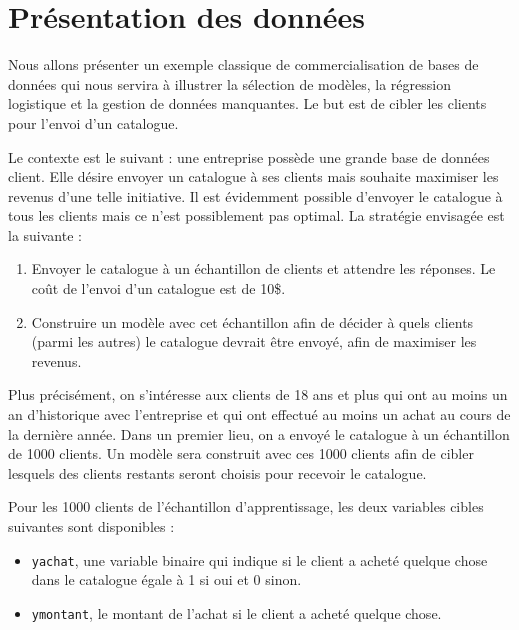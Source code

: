 \documentclass[
  11pt,
  letterpaper,
]{scrbook}
\providecommand{\tightlist}{%
  \setlength{\itemsep}{0pt}\setlength{\parskip}{0pt}}\usepackage{longtable,booktabs,array}
\theoremstyle{definition}
\theoremstyle{remark}
\begin{document}
\hypertarget{pruxe9sentation-des-donnuxe9es}{%
\section{Présentation des
données}\label{pruxe9sentation-des-donnuxe9es}}

Nous allons présenter un exemple classique de commercialisation de bases
de données qui nous servira à illustrer la sélection de modèles, la
régression logistique et la gestion de données manquantes. Le but est de
cibler les clients pour l'envoi d'un catalogue.

Le contexte est le suivant : une entreprise possède une grande base de
données client. Elle désire envoyer un catalogue à ses clients mais
souhaite maximiser les revenus d'une telle initiative. Il est évidemment
possible d'envoyer le catalogue à tous les clients mais ce n'est
possiblement pas optimal. La stratégie envisagée est la suivante :

\begin{enumerate}
\def\labelenumi{\arabic{enumi}.}
\tightlist
\item
  Envoyer le catalogue à un échantillon de clients et attendre les
  réponses. Le coût de l'envoi d'un catalogue est de 10\$.
\item
  Construire un modèle avec cet échantillon afin de décider à quels
  clients (parmi les autres) le catalogue devrait être envoyé, afin de
  maximiser les revenus.
\end{enumerate}

Plus précisément, on s'intéresse aux clients de 18 ans et plus qui ont
au moins un an d'historique avec l'entreprise et qui ont effectué au
moins un achat au cours de la dernière année. Dans un premier lieu, on a
envoyé le catalogue à un échantillon de 1000 clients. Un modèle sera
construit avec ces 1000 clients afin de cibler lesquels des clients
restants seront choisis pour recevoir le catalogue.

Pour les 1000 clients de l'échantillon d'apprentissage, les deux
variables cibles suivantes sont disponibles :

\begin{itemize}
\tightlist
\item
  \texttt{yachat}, une variable binaire qui indique si le client a
  acheté quelque chose dans le catalogue égale à 1 si oui et 0 sinon.
\item
  \texttt{ymontant}, le montant de l'achat si le client a acheté quelque
  chose.
\end{itemize}
\end{document}
